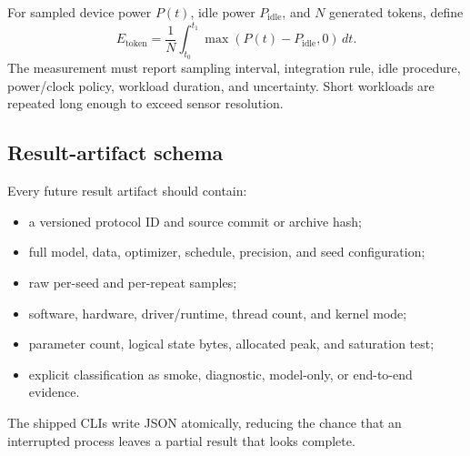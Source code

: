 For sampled device power \(P(t)\), idle power \(P_{\mathrm{idle}}\), and \(N\)
generated tokens, define
\begin{equation}
  E_{\mathrm{token}}=
  \frac{1}{N}\int_{t_0}^{t_1}
  \max\!\left(P(t)-P_{\mathrm{idle}},0\right)\,dt.
  \label{eq:energy}
\end{equation}
The measurement must report sampling interval, integration rule, idle
procedure, power/clock policy, workload duration, and uncertainty. Short
workloads are repeated long enough to exceed sensor resolution.

\subsection{Result-artifact schema}

Every future result artifact should contain:

\begin{itemize}
  \item a versioned protocol ID and source commit or archive hash;
  \item full model, data, optimizer, schedule, precision, and seed
  configuration;
  \item raw per-seed and per-repeat samples;
  \item software, hardware, driver/runtime, thread count, and kernel mode;
  \item parameter count, logical state bytes, allocated peak, and saturation
  test;
  \item explicit classification as smoke, diagnostic, model-only, or
  end-to-end evidence.
\end{itemize}

The shipped CLIs write JSON atomically, reducing the chance that an interrupted
process leaves a partial result that looks complete.
